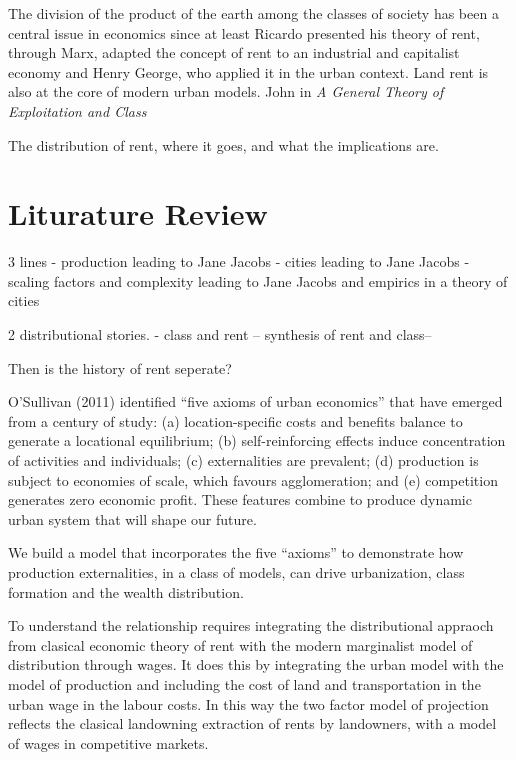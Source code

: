 The division of the product of the earth among the classes of society has been a central issue in economics since at least Ricardo presented his theory of  rent, through Marx, adapted the concept of rent to an industrial and capitalist economy and Henry George, who applied it in the urban context. Land rent is also at the core of modern urban models.  John %
in \textit{A General Theory of Exploitation and Class} 


The distribution of rent, where it goes, and what the implications are. 

\section{Liturature Review}

3 lines  
- production leading to Jane Jacobs
- cities leading to Jane Jacobs
- scaling factors and complexity leading to Jane Jacobs and empirics in a theory of cities

2 distributional stories.
- class and rent -- synthesis of rent and class--

Then is the history of rent seperate?

O’Sullivan (2011) identified “five axioms of urban economics” that have emerged from a century of study: (a) location-specific costs and benefits balance to generate a locational equilibrium; (b) self-reinforcing effects induce concentration of activities and individuals; (c) externalities are prevalent; (d) production is subject to economies of scale, which favours agglomeration; and (e) competition generates zero economic profit. These features combine to produce dynamic urban system that will shape our future. 

We build a model that incorporates the five “axioms” to demonstrate how production externalities, in a class of models, can drive urbanization, class formation and the wealth distribution.

To understand the relationship requires integrating the distributional appraoch from clasical economic theory of rent with the modern marginalist model of distribution through wages. It does this by integrating the urban model with the model of production and including the cost of land and transportation in the urban wage in the labour costs. 
In this way the two factor model of projection reflects the clasical landowning extraction of rents by landowners, with a model of wages in competitive markets. 

